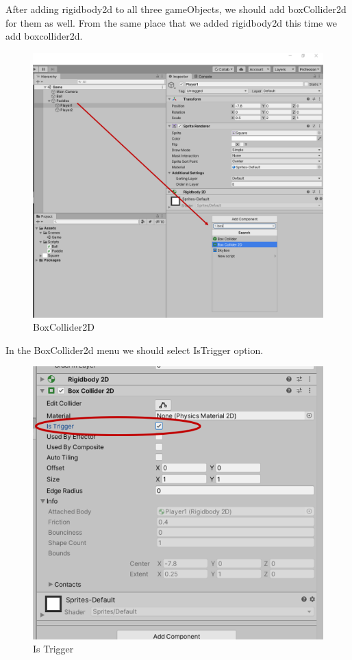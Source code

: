 \documentclass[
]{book}
\begin{document}
After adding rigidbody2d to all three gameObjects, we should add boxCollider2d for them as well. From the same place that we added rigidbody2d this time we add boxcollider2d.

\begin{figure}
\centering
\includegraphics{Images/BoxCollider2d.png}
\caption{BoxCollider2D}
\end{figure}

In the BoxCollider2d menu we should select IsTrigger option.

\begin{figure}
\centering
\includegraphics{Images/IsTrigger.png}
\caption{Is Trigger}
\end{figure}
\end{document}

